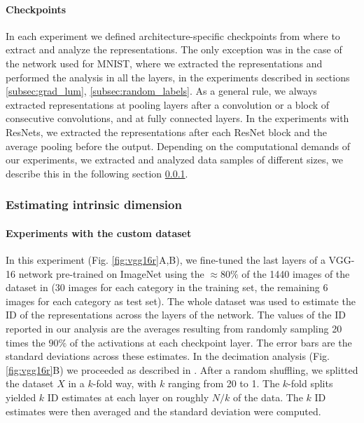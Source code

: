 \documentclass{article}
\begin{document}
\paragraph{Checkpoints}

In each experiment we defined architecture-specific checkpoints from where to extract and analyze the representations. The only exception was in the case of the network used for MNIST, where we extracted the representations and performed the analysis in all the layers, in the experiments described in sections \ref{subsec:grad_lum}, \ref{subsec:random_labels}. As a general rule, we always extracted representations at pooling layers after a convolution or a block of consecutive convolutions, and at fully connected layers. In the experiments with ResNets, we extracted the representations after each ResNet block \cite{He2015} and the average pooling before the output. Depending on the computational demands of our experiments, we extracted and analyzed data samples of different sizes, we describe this in the following section \ref{id_estimation}.


\subsubsection{Estimating intrinsic dimension}\label{id_estimation}


\paragraph{Experiments with the custom dataset}
In this experiment (Fig. \ref{fig:vgg16r}A,B), we fine-tuned the last layers of a VGG-16 network pre-trained on ImageNet using the $\approx 80\%$ of the 1440 images of the dataset in \cite{vascon2018characterization} (30 images for each category in the training set, the remaining 6 images for each category as test set). The whole dataset was used to estimate the ID of the representations across the layers of the network. The values of the ID reported in our analysis are the averages resulting from randomly sampling 20 times the $90\%$ of the activations at each checkpoint layer. The error bars are the standard deviations across these estimates.
In the decimation analysis (Fig. \ref{fig:vgg16r}B) we proceeded as described in \cite{facco2017estimating}. After a random shuffling, we splitted the dataset $X$ in a $k$-fold way, with $k$ ranging from 20 to 1. The $k$-fold splits yielded $k$ ID estimates at each layer on roughly $N/k$ of the data. The $k$ ID estimates were then averaged and the standard deviation were computed.
\end{document}
